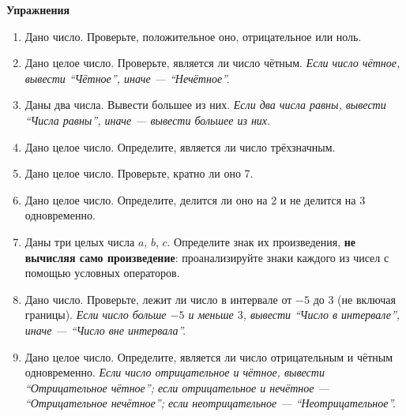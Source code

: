 \documentclass[a4paper,12pt]{article}
\theoremstyle{remark}
\begin{document}
\textbf{Упражнения}
\begin{enumerate}

    \item Дано число. Проверьте, положительное оно, отрицательное или ноль.

    \item Дано целое число. Проверьте, является ли число чётным.
    \textit{Если число чётное, вывести \enquote{Чётное}, иначе — \enquote{Нечётное}.}

    \item Даны два числа. Вывести большее из них.
    \textit{Если два числа равны, вывести \enquote{Числа равны}, иначе — вывести большее из них.}

    \item Дано целое число. Определите, является ли число трёхзначным.

    \item Дано целое число. Проверьте, кратно ли оно 7.

    \item Дано целое число. Определите, делится ли оно на 2 и не делится на 3 одновременно.

    \item Даны три целых числа $a$, $b$, $c$. Определите знак их произведения, \textbf{не вычисляя само произведение}: проанализируйте знаки каждого из чисел с помощью условных операторов.

    \item Дано число. Проверьте, лежит ли число в интервале от $-5$ до $3$ (не включая границы).
    \textit{Если число больше $-5$ и меньше $3$, вывести \enquote{Число в интервале}, иначе — \enquote{Число вне интервала}.}

    \item Дано целое число. Определите, является ли число отрицательным и чётным одновременно.
    \textit{Если число отрицательное и чётное, вывести \enquote{Отрицательное чётное}; если отрицательное и нечётное — \enquote{Отрицательное нечётное}; если неотрицательное — \enquote{Неотрицательное}.}




\end{enumerate}
\end{document}
